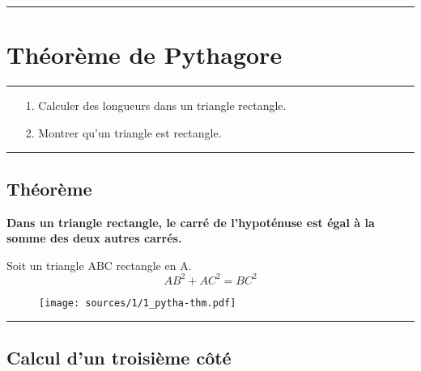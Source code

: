 \documentclass[12pt]{article}
\newcommand{\horrule}[1]{\rule{\linewidth}{#1}} %
\begin{document}

\newtheorem{Definition}{Définition}
\newtheorem{Theorem}{Théorème}
\newtheorem{Proposition}{Propriété}

\renewcommand{\labelitemi}{$\bullet$}
\renewcommand{\labelitemii}{$\circ$}

\setlength{\columnseprule}{1pt}

\horrule{1px}
\section*{Théorème de Pythagore}
\horrule{1px}

\begin{enumerate}
\item[1.] Calculer des longueurs dans un triangle rectangle.
\item[2.] Montrer qu'un triangle est rectangle.
\end{enumerate}

\horrule{1px}

\begin{multicols}{2}

  \subsection*{Théorème}

  \textbf{Dans un triangle rectangle, le carré de l’hypoténuse est égal à la somme des deux autres carrés.}

  Soit un triangle ABC rectangle en A. 
  $$AB^2 + AC^2 = BC^2$$

  \begin{figure}[H]
    \centering
    \texttt{[image: sources/1/1\_pytha-thm.pdf]}
  \end{figure}

\end{multicols}

\vspace{-0.5cm}
\horrule{1px}
\vspace{-1cm}

\subsection*{Calcul d'un troisième côté}
\end{document}
